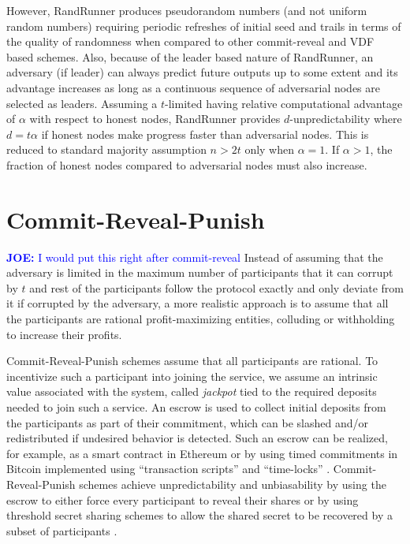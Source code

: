 \documentclass[letterpaper,twocolumn,10pt]{article}
\theoremstyle{definition}
\theoremstyle{remark}
\newcommand{\joenote}[1]{\textcolor{blue}{\textbf{JOE:} #1}}
\begin{document}
However, RandRunner produces pseudorandom numbers (and not uniform random numbers) requiring periodic refreshes of initial seed and trails in terms of the quality of randomness when compared to other commit-reveal and VDF based schemes. Also, because of the leader based nature of RandRunner, an adversary (if leader) can always predict future outputs up to some extent and its advantage increases as long as a continuous sequence of adversarial nodes are selected as leaders. Assuming a $t$-limited having relative computational advantage of $\alpha$ with respect to honest nodes, RandRunner provides $d$-unpredictability where $d = t \alpha$ if honest nodes make progress faster than adversarial nodes. This is reduced to standard majority assumption $n > 2t$ only when $\alpha = 1$. If $\alpha > 1$, the fraction of honest nodes compared to adversarial nodes must also increase.

\section{Commit-Reveal-Punish}
\joenote{I would put this right after commit-reveal}
\label{section:commit-reveal-punish}
Instead of assuming that the adversary is limited in the maximum number of participants  that it can corrupt by $t$ and rest of the participants follow the protocol exactly and only deviate from it if corrupted by the adversary, a more realistic approach is to assume that all the participants are rational profit-maximizing entities, colluding or withholding to increase their profits. 

Commit-Reveal-Punish schemes assume that all participants are rational. To incentivize such a participant into joining the service, we assume an intrinsic value associated with the system, called \emph{jackpot} tied to the required deposits needed to join such a service. An escrow is used to collect initial deposits from the participants as part of their commitment, which can be slashed and/or redistributed if undesired behavior is detected. Such an escrow can be realized, for example, as a smart contract in Ethereum \cite{youcai2017randao, david2020economically} or by using timed commitments \cite{boneh2000timed} in Bitcoin implemented using ``transaction scripts'' and ``time-locks'' \cite{andrychowicz2014secure}.  Commit-Reveal-Punish schemes achieve unpredictability and unbiasability by using the escrow to either force every participant to reveal their shares \cite{youcai2017randao, andrychowicz2014secure, bentov2014use} or by using threshold secret sharing schemes to allow the shared secret to be recovered by a subset of participants \cite{david2020economically}. 
\end{document}

